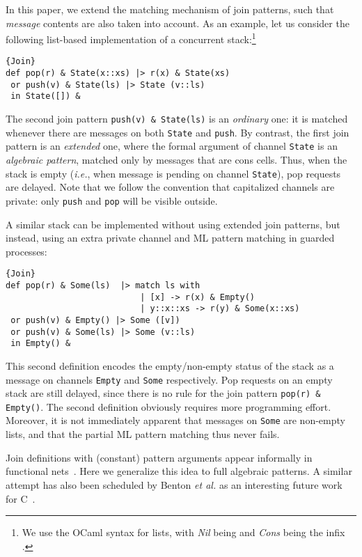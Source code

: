 \documentclass{LMCS}
\makeatletter
\let \lst \lstinline
\newcommand{\etal}{\emph{et al.}\@\xspace}
\newcommand{\ie}{\emph{i.e.}\@\xspace}
\newcommand{\ocaml}{\textrm{OCaml}\xspace}
\newcommand{\comega}{C\xspace}
\renewcommand{\_}{\mathord{\rule[-.25ex]{1ex}{.15ex}}}
\makeatother
\begin{document}
In this paper, we extend the matching mechanism of join patterns, such
that \emph{message} contents are also taken into account. As an
example, let us consider the following list-based implementation of a
concurrent stack:\footnote{We use the \ocaml syntax for lists,
  with \emph{Nil} being  and \emph{Cons} being the infix
  .}
\begin{lstlisting}{Join}
def pop(r) & State(x::xs) |> r(x) & State(xs)
 or push(v) & State(ls) |> State (v::ls) 
 in State([]) & 
\end{lstlisting}
The second join pattern \lst"push(v) & State(ls)" is an
\emph{ordinary} one: it is matched whenever there are messages on both
\lst"State" and \lst"push". By contrast, the first join pattern is an
\emph{extended} one, where the formal argument of channel \lst"State"
is an \emph{algebraic pattern}, matched only by messages that are
cons cells.  Thus, when the stack is empty (\ie, when message
 is pending on channel \lst"State"), pop requests are delayed.
Note that we follow the convention that capitalized channels are
private: only \lst"push" and \lst"pop" will be visible outside.

A similar stack can be implemented without using extended join
patterns, but instead, using an extra private channel and ML pattern
matching in guarded processes:
\begin{lstlisting}{Join}
def pop(r) & Some(ls)  |> match ls with 
                           | [x] -> r(x) & Empty() 
                           | y::x::xs -> r(y) & Some(x::xs)
 or push(v) & Empty() |> Some ([v])
 or push(v) & Some(ls) |> Some (v::ls)
 in Empty() & 
\end{lstlisting}
This second definition encodes the empty/non-empty status of
the stack as a message on channels \lst|Empty| and \lst|Some| respectively.
Pop requests on an empty stack are still delayed, since there is
no rule for the join pattern \lst|pop(r) & Empty()|.
The second definition obviously requires more programming
effort. Moreover, it is not immediately apparent that messages on
\lst"Some" are non-empty lists, and that the partial ML pattern
matching thus never fails.

Join definitions with (constant) pattern arguments appear informally
in functional nets~\cite{odersky:esop2000}. Here we generalize this
idea to full algebraic patterns. A similar attempt has also been
scheduled by Benton \etal as an interesting future work for
\comega~\cite{Cw}.
\end{document}
